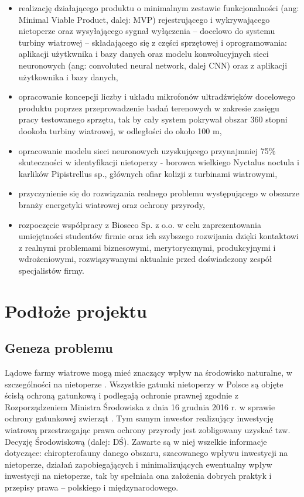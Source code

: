 \documentclass{sprz}
\begin{document}
\begin{itemize}
  \item{realizację działającego produktu o minimalnym zestawie funkcjonalności (ang: Minimal Viable Product, dalej: MVP) rejestrującego i wykrywającego nietoperze oraz wysyłającego sygnał wyłączenia – docelowo do systemu turbiny wiatrowej – składającego się z części sprzętowej i oprogramowania: aplikacji użytkwnika i bazy danych oraz modelu konwolucyjnych sieci neuronowych (ang: convoluted neural network, dalej CNN) oraz z aplikacji użytkownika i bazy danych,}
  \item{opracowanie koncepcji liczby i układu mikrofonów ultradźwięków docelowego produktu poprzez przeprowadzenie badań terenowych w zakresie zasięgu pracy testowanego sprzętu, tak by cały system pokrywał obszar 360 stopni dookoła turbiny wiatrowej, w odległości do około 100 m,}
  \item{opracowanie modelu sieci neuronowych uzyskującego przynajmniej 75\% skuteczności w identyfikacji nietoperzy - borowca wielkiego Nyctalus noctula i karlików Pipistrellus sp., głównych ofiar kolizji z turbinami wiatrowymi,}
  \item{przyczynienie się do rozwiązania realnego problemu występującego w obszarze branży energetyki wiatrowej oraz ochrony przyrody,}
  \item{rozpoczęcie współpracy z Bioseco Sp. z o.o. w celu zaprezentowania umiejętności studentów firmie oraz ich szybszego rozwijania dzięki kontaktowi z realnymi problemami biznesowymi, merytorycznymi, produkcyjnymi i wdrożeniowymi, rozwiązywanymi aktualnie przed doświadczony zespół specjalistów firmy.}
  \end{itemize}
  

\chapter{Podłoże projektu}

\section{Geneza problemu}

Lądowe farmy wiatrowe mogą mieć znaczący wpływ na środowisko naturalne, w szczególności na nietoperze \cite{Wytyczne}. Wszystkie gatunki nietoperzy w Polsce są objęte ścisłą ochroną gatunkową i podlegają ochronie prawnej zgodnie z Rozporządzeniem Ministra Środowiska z dnia 16 grudnia 2016 r. w sprawie ochrony gatunkowej zwierząt \cite{Rozporządzenie}. Tym samym inwestor realizujący inwestycję wiatrową przestrzegając prawa ochrony przyrody jest zobligowany uzyskać tzw. Decyzję Środowiskową (dalej: DŚ). Zawarte są w niej 
wszelkie informacje dotyczące: chiropterofauny danego obszaru, szacowanego wpływu inwestycji na nietoperze, działań zapobiegających i minimalizujących ewentualny wpływ inwestycji na nietoperze, tak by spełniała ona założenia dobrych praktyk i przepisy prawa – polskiego 
i międzynarodowego. 
\end{document}
